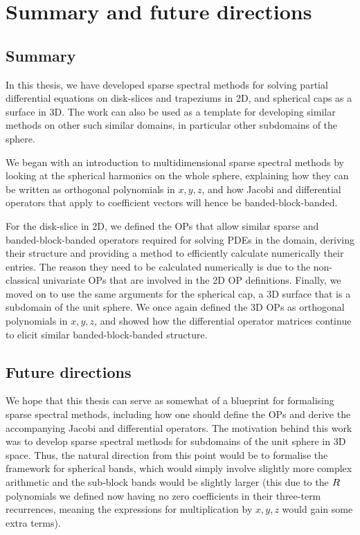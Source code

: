 

\chapter{Summary and future directions}

\section{Summary}

In this thesis, we have developed sparse spectral methods for solving partial differential equations on disk-slices and trapeziums in 2D, and spherical caps as a surface in 3D. The work can also be used as a template for developing similar methods on other such similar domains, in particular other subdomains of the sphere.

We began with an introduction to multidimensional sparse spectral methods by looking at the spherical harmonics on the whole sphere, explaining how they can be written as orthogonal polynomials in $x,y,z$, and how Jacobi and differential operators that apply to coefficient vectors will hence be banded-block-banded.

For the disk-slice in 2D, we defined the OPs that allow similar sparse and banded-block-banded operators required for solving PDEs in the domain, deriving their structure and providing a method to efficiently calculate numerically their entries. The reason they need to be calculated numerically is due to the non-classical univariate OPs that are involved in the 2D OP definitions. Finally, we moved on to use the same arguments for the spherical cap, a 3D surface that is a subdomain of the unit sphere. We once again defined the 3D OPs as orthogonal polynomials in $x,y,z$, and showed how the differential operator matrices continue to elicit similar banded-block-banded structure.


\section{Future directions}

We hope that this thesis can serve as somewhat of a blueprint for formalising sparse spectral methods, including how one should define the OPs and derive the accompanying Jacobi and differential operators. The motivation behind this work was to develop sparse spectral methods for subdomains of the unit sphere in 3D space. Thus, the natural direction from this point would be to formalise the framework for spherical bands, which would simply involve slightly more complex arithmetic and the sub-block bands would be slightly larger (this due to the $R$ polynomials we defined now having no zero coefficients in their three-term recurrences, meaning the expressions for multiplication by $x,y,z$ would gain some extra terms).

